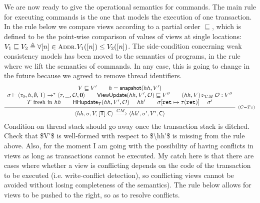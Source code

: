 \documentclass[a4paper,UKenglish]{article}%
\theoremstyle{plain}
\begin{document}
We are now ready to give the operational semantics for commands.
The main rule for executing commands is the one that models the execution of one transaction. 
In the rule below we compare views according to a partial order $\sqsubseteq$, which 
is defined to be the point-wise comparison of values of views at single locations: 
$V_1 \sqsubseteq V_2 \triangleq \forall [n] \in \Addr. V_1([n]) \leq V_2([n])$.
\ac{The side-condition concerning weak consistency models 
has been moved to the semantics of programs, in the rule where we 
lift the semantics of commands. In any case, this is going to change in the future 
because we agreed to remove thread identifiers.}
\[
\infer[{\scriptstyle(C-Tx)}]{\langle \hh, \thdstack, V, [\trans].\cmd \rangle \xrightarrow{CM} \langle \hh', \thdstack', V', \cmd \rangle}
{\begin{array}{c}
V \sqsubseteq V' \qquad 
h = \snapshot(\hh, V') \\
\thdstack \vdash \langle \txstack_{0}, \heap, \emptyset, \trans \rangle \rightarrow^{\ast} \langle \txstack, \_, \mathcal{O}, \nil \rangle 
\qquad \mathsf{ViewUpdate}(\hh, V', \mathcal{O}) \sqsubseteq V'' \qquad (\hh, V) \triangleright_{CM} \mathcal{O} : V'' \\
\tsid \text{ fresh in } \hh \qquad 
\mathsf{HHupdate}_{\tsid}(\hh, V', \mathcal{O}) = \hh' \qquad 
\thdstack[\retvar \mapsto \txstack(\retvar)] = \thdstack'
\end{array}
}
\]
\ac{Condition on thread stack should go away once the transaction stack is ditched.}
\ac{Check that $V'$ is well-formed with respect to $\hh'$ is missing from the rule above. 
Also, for the moment I am going with the possibility of having conflicts in views as long as 
transactions cannot be executed. My catch here is that there are cases where whether 
a view is conflicting depends on the code of the transaction to be executed (i.e. write-conflict 
detection), so conflicting views cannot be avoided without losing completeness of the semantics). 
The rule below allows for views to be pushed to the right, so as to resolve conflicts.}
\end{document}
